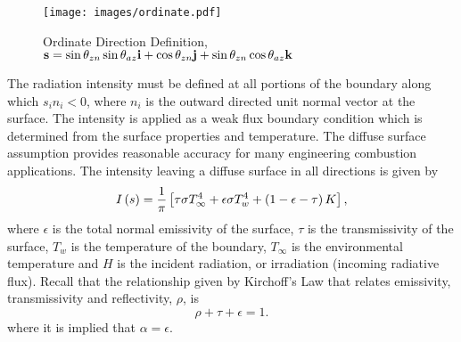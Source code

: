 \begin{figure}[ht]
\centerline{\texttt{[image: images/ordinate.pdf]}}
\vspace{0.1in}
\caption{Ordinate Direction Definition, \newline
         ${\bf s} = \sin \theta_{zn} \sin \theta_{az} {\bf i}
            + \cos \theta_{zn} {\bf j} 
            + \sin \theta_{zn} \cos \theta_{az} {\bf k}$}
\label{ord-dir}
\end{figure}


The radiation intensity must be defined at all portions 
of the boundary along which $s_i n_i < 0$, where $n_i$ is the 
outward directed 
unit normal vector at the surface.  The intensity is applied as a 
weak flux boundary condition which is determined from the surface 
properties and temperature.  The diffuse surface assumption 
provides reasonable accuracy for many engineering combustion 
applications.  The intensity leaving a diffuse surface in all 
directions is given by
%
\begin{equation}
  I\left(s\right) = {1 \over \pi} \left[ \tau \sigma T_\infty^4 
                  + \epsilon \sigma T_w^4
                  + \left(1 - \epsilon - \tau \right) K \right] ,
\label{intBc}
\end{equation}
%
where $\epsilon$ is the total normal emissivity of the 
surface, $\tau$ is the transmissivity of the surface, $T_w$ is the 
temperature of the boundary, $T_\infty$ is the environmental 
temperature and  $H$ is the incident radiation, or irradiation (incoming radiative flux). 
Recall that the relationship given by Kirchoff's 
Law that relates emissivity, transmissivity and reflectivity, $\rho$, is
%
\begin{equation}
  \rho + \tau + \epsilon = 1.
\end{equation}
%
where it is implied that $\alpha = \epsilon$.

